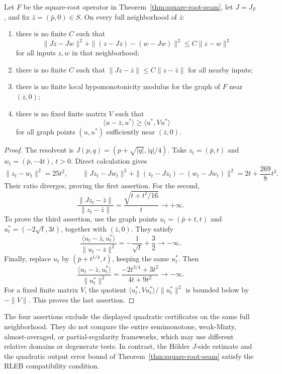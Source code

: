 \begin{proposition}
\label{prop:seam-quadratic-separation}
Let $F$ be the square-root operator in
Theorem~\ref{thm:square-root-seam}, let $J=J_F$, and fix
$\bar z=(\bar p,0)\in S$.  On every full neighborhood of $\bar z$:
\begin{enumerate}
\item there is no finite $C$ such that
\begin{equation}
 \|Jz-Jw\|^2+
 \|(z-Jz)-(w-Jw)\|^2\le C\|z-w\|^2
 \label{eq:excluded-quadratic-J}
\end{equation}
for all inputs $z,w$ in that neighborhood;
\item there is no finite $C$ such that
$\|Jz-\bar z\|\le C\|z-\bar z\|$ for all nearby inputs;
\item there is no finite local hypomonotonicity modulus for the graph of $F$
near $(\bar z,0)$;
\item there is no fixed finite matrix $V$ such that
\begin{equation}
 \langle u-\bar z,u^*\rangle\ge\langle u^*,Vu^*\rangle
 \label{eq:excluded-fixed-anchor-matrix}
\end{equation}
for all graph points $(u,u^*)$ sufficiently near $(\bar z,0)$.
\end{enumerate}
\end{proposition}

\begin{proof}
The resolvent is
$J(p,q)=(p+\sqrt{|q|},|q|/4)$.  Take
$z_t=(\bar p,t)$ and $w_t=(\bar p,-4t)$, $t>0$.  Direct calculation gives
\[
 \|z_t-w_t\|^2=25t^2,
 \qquad
 \|Jz_t-Jw_t\|^2+
 \|(z_t-Jz_t)-(w_t-Jw_t)\|^2
 =2t+\frac{269}{8}t^2.
\]
Their ratio diverges, proving the first assertion.  For the second,
\[
 \frac{\|Jz_t-\bar z\|}{\|z_t-\bar z\|}
 =\frac{\sqrt{t+t^2/16}}{t}\longrightarrow+\infty.
\]
To prove the third assertion, use the graph points
$u_t=(\bar p+t,t)$ and $u_t^*=(-2\sqrt t,3t)$, together with
$(\bar z,0)$.  They satisfy
\[
 \frac{\langle u_t-\bar z,u_t^*\rangle}
      {\|u_t-\bar z\|^2}
 =-\frac1{\sqrt t}+\frac32\longrightarrow-\infty.
\]
Finally, replace $u_t$ by $(\bar p+t^{1/4},t)$, keeping the same $u_t^*$.
Then
\[
 \frac{\langle u_t-\bar z,u_t^*\rangle}{\|u_t^*\|^2}
 =\frac{-2t^{3/4}+3t^2}{4t+9t^2}\longrightarrow-\infty.
\]
For a fixed finite matrix $V$, the quotient
$\langle u_t^*,Vu_t^*\rangle/\|u_t^*\|^2$ is bounded below by
$-\|V\|$.  This proves the last assertion.
\end{proof}

The four assertions exclude the displayed quadratic certificates on the same
full neighborhood.  They do not compare the entire semimonotone, weak-Minty,
almost-averaged, or partial-regularity frameworks, which may use different
relative domains or degenerate tests.  In contrast, the H\"older $J$-side
estimate and the quadratic output error bound of
Theorem~\ref{thm:square-root-seam} satisfy the RLEB compatibility condition.
